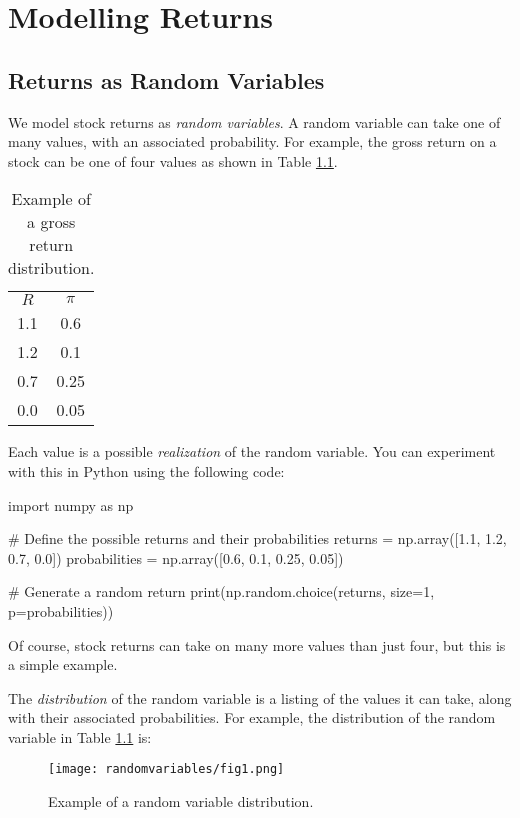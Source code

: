 \chapter{Modelling Returns}


\section{Returns as Random Variables}

We model stock returns as \textit{random variables}.
A random variable can take one of many values, with an 
associated probability. For example, the gross return on 
a stock can be one of four values as shown in Table \ref{tab:randomvariable}.

\begin{table}[!htbp]
    \centering
    \begin{tabular}{c c}
        $R$ & $\pi$ \\
        1.1 & 0.6 \\
        1.2 & 0.1 \\
        0.7 & 0.25 \\
        0.0 & 0.05 \\
    \end{tabular}
    \caption{Example of a gross return distribution.}
    \label{tab:randomvariable}
\end{table}

Each value is a possible \textit{realization}
of the random variable. You can experiment with this in Python
using the following code:

\begin{python}
import numpy as np

# Define the possible returns and their probabilities
returns = np.array([1.1, 1.2, 0.7, 0.0])
probabilities = np.array([0.6, 0.1, 0.25, 0.05])

# Generate a random return
print(np.random.choice(returns, size=1, p=probabilities))

\end{python}

Of course, stock returns can take on many more values 
than just four, but this is a simple example.

The \textit{distribution} of the random variable is 
a listing of the values it can take, along with their
associated probabilities. For example, the distribution
of the random variable in Table \ref{tab:randomvariable}
is:

\begin{figure}[!htbp]
    \centering
    \texttt{[image: randomvariables/fig1.png]}
    \caption{Example of a random variable distribution.}
    \label{fig:randomvariable}
\end{figure}

